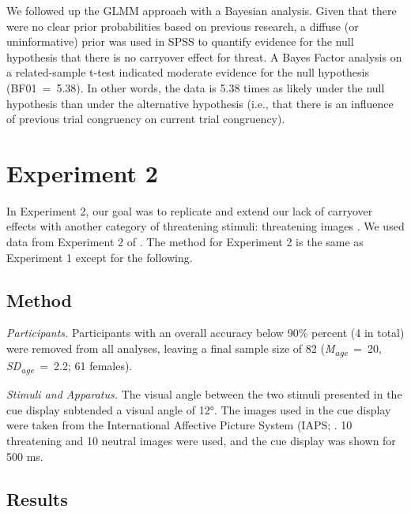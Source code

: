 \documentclass[issue,header,twocolumn,empirical, authordate,10pt]{jote-new-article}
\begin{document}
We followed up the GLMM approach with a Bayesian analysis. Given that there were no clear prior probabilities based on previous research, a diffuse (or uninformative) prior was used in SPSS to quantify evidence for the null hypothesis that there is no carryover effect for threat. A Bayes Factor analysis on a related-sample t-test indicated moderate evidence for the null hypothesis (BF01~=~5.38). In other words, the data is 5.38 times as likely under the null hypothesis than under the alternative hypothesis (i.e., that there is an influence of previous trial congruency on current trial congruency).

\section{Experiment 2}

In Experiment 2, our goal was to replicate and extend our lack of carryover effects with another category of threatening stimuli: threatening images \parencite{Lang2008}. We used data from Experiment 2 of \parencite{Carlson2020}. The method for Experiment 2 is the same as Experiment 1 except for the following.


\subsection{Method}

\emph{Participants. }Participants with an overall accuracy below 90\% percent (4 in total) were removed from all analyses, leaving a final sample size of 82 (\emph{M}\textsubscript{\emph{age}}~=~20, \emph{SD}\textsubscript{\emph{age}}~=~2.2; 61 females).

\emph{Stimuli and Apparatus. }The visual angle between the two stimuli presented in the cue display subtended a visual angle of 12°. The images used in the cue display were taken from the International Affective Picture System (IAPS; \parencite[200][]{Lang2008}. 10 threatening and 10 neutral images were used, and the cue display was shown for 500 ms.


\subsection{Results}
\end{document}
